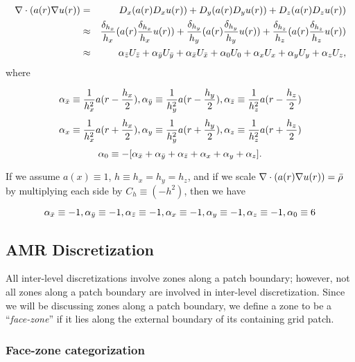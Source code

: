 \documentclass[10pt]{article}
\begin{document}
\begin{center}
\begin{minipage}{1.5in}
\end{minipage} 
\end{center}


 \begin{eqnarray*}
 \nabla\cdot(a(r) \nabla u(r)) & = & D_x (a(r) D_x u(r)) + D_y (a(r) D_y u(r)) + D_z (a(r) D_z u(r)) \\
 & \approx & \frac{\delta_{h_x}}{h_x} (a(r) \frac{\delta_{h_x}}{h_x} u(r)) + 
             \frac{\delta_{h_y}}{h_y} (a(r) \frac{\delta_{h_y}}{h_y} u(r)) + 
             \frac{\delta_{h_z}}{h_z} (a(r) \frac{\delta_{h_z}}{h_z} u(r)) \\
 & \approx & \alpha_{\bar{z}}U_{\bar{z}} +  \alpha_{\bar{y}}U_{\bar{y}} +  \alpha_{\bar{x}}U_{\bar{x}} 
  +  \alpha_{0}U_{0} 
  +  \alpha_{x}U_{x} +  \alpha_{y}U_{y} +  \alpha_{z}U_{z},
 \end{eqnarray*}
where

\[\alpha_{\bar{x}}  \equiv  \frac{1}{h_x^2} a(r-\frac{h_x}{2}),
 \alpha_{\bar{y}}  \equiv  \frac{1}{h_y^2} a(r-\frac{h_y}{2}), 
 \alpha_{\bar{z}}  \equiv  \frac{1}{h_z^2} a(r-\frac{h_z}{2}) \]
 \[\alpha_{x}  \equiv  \frac{1}{h_x^2} a(r+\frac{h_x}{2}), 
 \alpha_{y}  \equiv  \frac{1}{h_y^2} a(r+\frac{h_y}{2}),
 \alpha_{z}  \equiv  \frac{1}{h_z^2} a(r+\frac{h_z}{2}) \]
 \[\alpha_{0}   \equiv  - [\alpha_{\bar{x}} + \alpha_{\bar{y}} + \alpha_{\bar{z}} + \alpha_{x} + \alpha_{y} + \alpha_{z}]. \]

If we assume $a(x)\equiv 1$, $h\equiv h_x = h_y = h_z$, and if we
scale $\nabla\cdot(a(r) \nabla u(r)) = \bar{\rho}$ by multiplying each
side by $C_h \equiv (-h^2)$, then we have

\[\alpha_{\bar{x}}  \equiv  -1,
 \alpha_{\bar{y}}  \equiv  -1,
 \alpha_{\bar{z}}  \equiv  -1,
 \alpha_{x}  \equiv  -1,
 \alpha_{y}  \equiv  -1,
 \alpha_{z}  \equiv  -1,
 \alpha_{0}   \equiv  6 \]

\subsection{AMR Discretization} \label{ss:discret-amr}

All inter-level discretizations involve zones along a patch boundary;
however, not all zones along a patch boundary are involved in
inter-level discretization.  Since we will be discussing zones along a
patch boundary, we define a zone to be a ``\textit{face-zone}'' if it
lies along the external boundary of its containing grid patch.


\subsubsection{Face-zone categorization}
\end{document}
